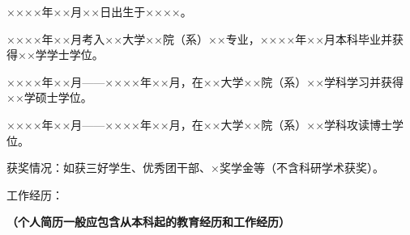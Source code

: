 \begin{resume}
××××年××月××日出生于××××。

××××年××月考入××大学××院（系）××专业，××××年××月本科毕业并获得××学学士学位。

××××年××月——××××年××月，在××大学××院（系）××学科学习并获得××学硕士学位。

××××年××月——××××年××月，在××大学××院（系）××学科攻读博士学位。

获奖情况：如获三好学生、优秀团干部、×奖学金等（不含科研学术获奖）。

工作经历：

\textbf{（个人简历一般应包含从本科起的教育经历和工作经历）}
\end{resume}
